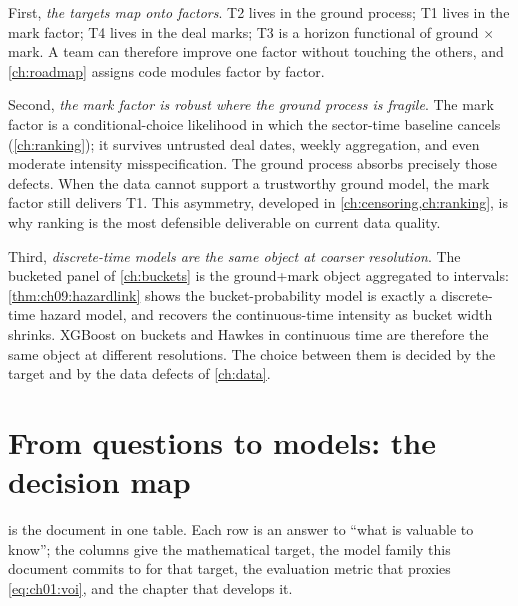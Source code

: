 First, \emph{the targets map onto factors}. T2 lives in the ground process;
T1 lives in the mark factor; T4 lives in the deal marks; T3 is a horizon
functional of ground $\times$ mark. A team can therefore improve one factor
without touching the others, and \cref{ch:roadmap} assigns code modules
factor by factor.

Second, \emph{the mark factor is robust where the ground process is
fragile}. The mark factor is a conditional-choice likelihood in which the
sector-time baseline cancels (\cref{ch:ranking}); it survives untrusted
deal dates, weekly aggregation, and even moderate intensity misspecification.
The ground process absorbs precisely those defects. When the data cannot
support a trustworthy ground model, the mark factor still delivers T1.
This asymmetry, developed in \cref{ch:censoring,ch:ranking}, is why
ranking is the most defensible deliverable on current data quality.

Third, \emph{discrete-time models are the same object at coarser
resolution}. The bucketed panel of \cref{ch:buckets} is the ground+mark
object aggregated to intervals: \cref{thm:ch09:hazardlink} shows the
bucket-probability model is exactly a discrete-time hazard model, and
recovers the continuous-time intensity as bucket width shrinks. XGBoost on
buckets and Hawkes in continuous time are therefore the same object at
different resolutions. The choice between them is decided by the target
and by the data defects of \cref{ch:data}.

\section{From questions to models: the decision map}\label{ch01:sec:map}

 is the document in one table. Each row is an answer to
``what is valuable to know''; the columns give the mathematical target, the
model family this document commits to for that target, the evaluation
metric that proxies \cref{eq:ch01:voi}, and the chapter that develops it.

